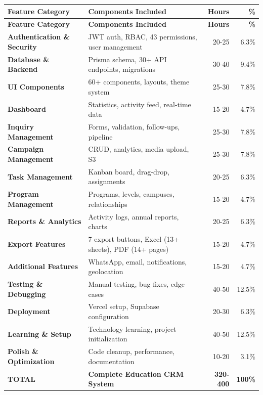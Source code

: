 \documentclass[11pt,a4paper]{article}
\begin{document}
\begin{longtable}{p{4cm}p{8cm}rr}
\toprule
\textbf{Feature Category} & \textbf{Components Included} & \textbf{Hours} & \textbf{\%} \\
\midrule
\endfirsthead
\toprule
\textbf{Feature Category} & \textbf{Components Included} & \textbf{Hours} & \textbf{\%} \\
\midrule
\endhead
\bottomrule
\endfoot
\bottomrule
\endlastfoot

\textbf{Authentication \& Security} & 
JWT auth, RBAC, 43 permissions, user management & 20-25 & 6.3\% \\

\textbf{Database \& Backend} & 
Prisma schema, 30+ API endpoints, migrations & 30-40 & 9.4\% \\

\textbf{UI Components} & 
60+ components, layouts, theme system & 25-30 & 7.8\% \\

\textbf{Dashboard} & 
Statistics, activity feed, real-time data & 15-20 & 4.7\% \\

\textbf{Inquiry Management} & 
Forms, validation, follow-ups, pipeline & 25-30 & 7.8\% \\

\textbf{Campaign Management} & 
CRUD, analytics, media upload, S3 & 25-30 & 7.8\% \\

\textbf{Task Management} & 
Kanban board, drag-drop, assignments & 20-25 & 6.3\% \\

\textbf{Program Management} & 
Programs, levels, campuses, relationships & 15-20 & 4.7\% \\

\textbf{Reports \& Analytics} & 
Activity logs, annual reports, charts & 20-25 & 6.3\% \\

\textbf{Export Features} & 
7 export buttons, Excel (13+ sheets), PDF (14+ pages) & 15-20 & 4.7\% \\

\textbf{Additional Features} & 
WhatsApp, email, notifications, geolocation & 15-20 & 4.7\% \\

\textbf{Testing \& Debugging} & 
Manual testing, bug fixes, edge cases & 40-50 & 12.5\% \\

\textbf{Deployment} & 
Vercel setup, Supabase configuration & 20-30 & 6.3\% \\

\textbf{Learning \& Setup} & 
Technology learning, project initialization & 40-50 & 12.5\% \\

\textbf{Polish \& Optimization} & 
Code cleanup, performance, documentation & 10-20 & 3.1\% \\

\midrule
\textbf{TOTAL} & \textbf{Complete Education CRM System} & \textbf{320-400} & \textbf{100\%} \\

\end{longtable}
\end{document}
